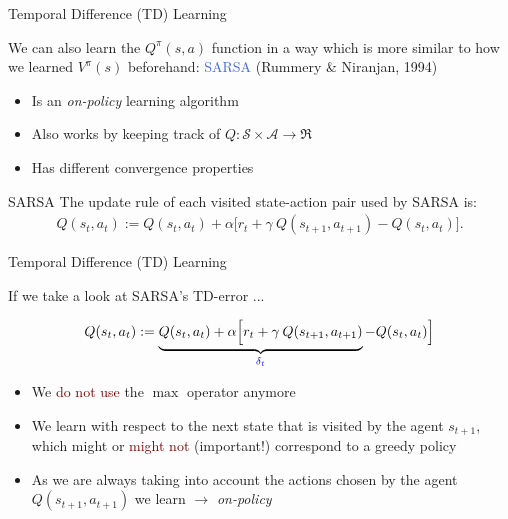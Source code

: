 \documentclass{beamer}
\begin{document}
\begin{frame}{Temporal Difference (TD) Learning}

	We can also learn the $Q^{\pi}(s,a)$ function in a way which is more similar to how we learned $V^{\pi}(s)$ beforehand: \textcolor{RoyalBlue}{SARSA} (Rummery \& Niranjan, 1994)

	\begin{itemize}
		\item Is an \textit{on-policy} learning algorithm
		\item Also works by keeping track of $Q: \mathcal{S} \times \mathcal{A} \rightarrow \Re$ 
		\item Has different convergence properties 

	\end{itemize}

	\begin{block}{SARSA}
		The update rule of each visited state-action pair used by SARSA is:
		\begin{align*}
			Q(s_t,a_t):=Q(s_t,a_t) + \alpha\Big[r_t + \gamma \:Q(s_{t+1},a_{t+1}) - Q(s_t, a_t) \Big].
		\end{align*}
	\end{block}
\end{frame}

\begin{frame}{Temporal Difference (TD) Learning}

		If we take a look at SARSA's TD-error ...

		\begin{align*}
			Q(s_t,a_t):=\underbrace{Q(s_t,a_t) + \alpha\Big[r_t + \gamma \: Q(s_{t+1},a_{t+1})}_{\textcolor{blue}{\delta_t}} - Q(s_t, a_t) \Big]
		\end{align*}


		\begin{itemize}
			\item \onslide<+-> We \textcolor{Maroon}{do not use} the $\max$ operator anymore
			\item \onslide<+-> We learn with respect to the next state that is visited by the agent $s_{t+1}$, which might or \textcolor{Maroon}{might not} (important!) correspond to a greedy policy
			\item \onslide<+-> As we are always taking into account the actions chosen by the agent $Q(s_{t+1}, a_{t+1})$ we learn $\rightarrow$ \textit{on-policy}
		\end{itemize}

\end{frame}
\end{document}
